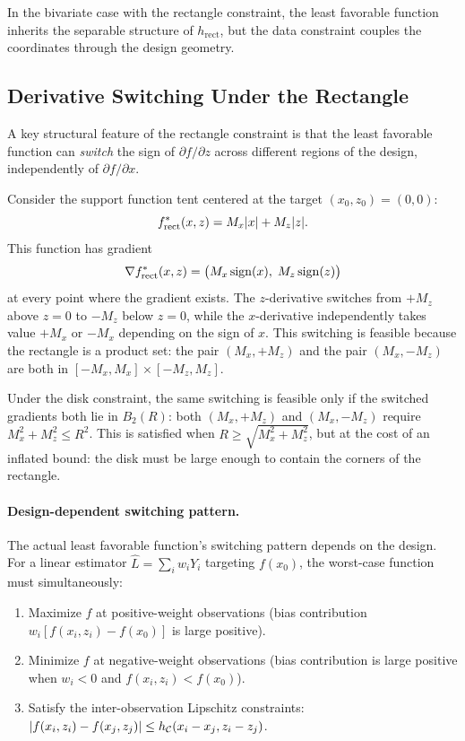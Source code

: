 In the bivariate case with the rectangle constraint, the least favorable function inherits the separable structure of $h_{\mathrm{rect}}$, but the data constraint couples the coordinates through the design geometry.


\subsection{Derivative Switching Under the Rectangle}\label{app:modulus:switching}

A key structural feature of the rectangle constraint is that the least favorable function can \emph{switch} the sign of $\partial f / \partial z$ across different regions of the design, independently of $\partial f / \partial x$.

Consider the support function tent centered at the target $(x_0, z_0) = (0, 0)$:
\begin{equation*}
	f^*_{\mathrm{rect}}(x, z) = M_x\lvert x\rvert + M_z\lvert z\rvert.
\end{equation*}
This function has gradient
\begin{equation*}
	\nabla f^*_{\mathrm{rect}}(x, z) = \bigl(M_x \operatorname{sign}(x),\; M_z \operatorname{sign}(z)\bigr)
\end{equation*}
at every point where the gradient exists.
The $z$-derivative switches from $+M_z$ above $z = 0$ to $-M_z$ below $z = 0$, while the $x$-derivative independently takes value $+M_x$ or $-M_x$ depending on the sign of $x$.
This switching is feasible because the rectangle is a product set: the pair $(M_x, +M_z)$ and the pair $(M_x, -M_z)$ are both in $[-M_x, M_x] \times [-M_z, M_z]$.

Under the disk constraint, the same switching is feasible only if the switched gradients both lie in $B_2(R)$:
both $(M_x, +M_z)$ and $(M_x, -M_z)$ require $M_x^2 + M_z^2 \leq R^2$.
This is satisfied when $R \geq \sqrt{M_x^2 + M_z^2}$, but at the cost of an inflated bound: the disk must be large enough to contain the corners of the rectangle.

\paragraph{Design-dependent switching pattern.}
The actual least favorable function's switching pattern depends on the design.
For a linear estimator $\hat{L} = \sum_i w_i Y_i$ targeting $f(x_0)$, the worst-case function must simultaneously:
\begin{enumerate}
	\item Maximize $f$ at positive-weight observations (bias contribution $w_i [f(x_i, z_i) - f(x_0)]$ is large positive).
	\item Minimize $f$ at negative-weight observations (bias contribution is large positive when $w_i < 0$ and $f(x_i, z_i) < f(x_0)$).
	\item Satisfy the inter-observation Lipschitz constraints: $\lvert f(x_i, z_i) - f(x_j, z_j)\rvert \leq h_{\mathcal{C}}(x_i - x_j, z_i - z_j)$.
\end{enumerate}


